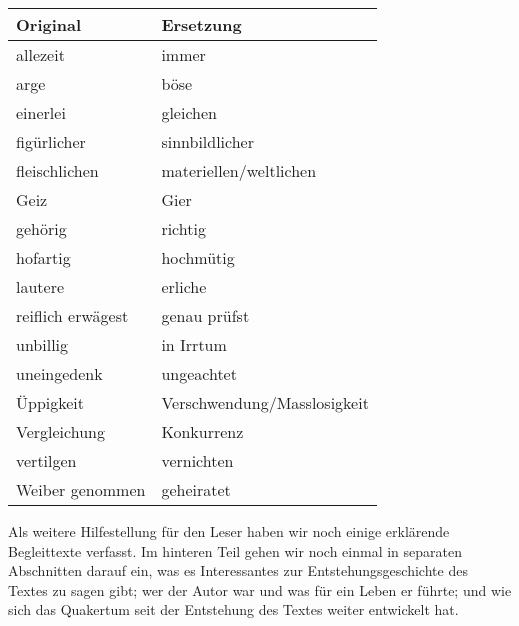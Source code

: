 \medskip

\begin{center}
\label{ref:tab_wortersetzungen}
\begin{tabular}{|l|l|} \hline
\textbf{Original}       & \textbf{Ersetzung}            \\ \hline \hline
allezeit                & immer                         \\ \hline
arge                    & böse                          \\ \hline
einerlei                & gleichen                      \\ \hline
figürlicher             & sinnbildlicher                \\ \hline
fleischlichen           & materiellen/weltlichen        \\ \hline
Geiz                    & Gier                          \\ \hline
gehörig                 & richtig                       \\ \hline
hofartig                & hochmütig                     \\ \hline
lautere                 & erliche                       \\ \hline
reiflich erwägest       & genau prüfst                  \\ \hline
unbillig                & in Irrtum                     \\ \hline
uneingedenk             & ungeachtet                    \\ \hline
Üppigkeit               & Verschwendung/Masslosigkeit   \\ \hline
Vergleichung            & Konkurrenz                    \\ \hline
vertilgen               & vernichten                    \\ \hline
Weiber genommen         & geheiratet                    \\ \hline
\end{tabular}
\end{center}
\medskip

\medskip

Als weitere Hilfestellung für den Leser haben wir noch einige erklärende
Begleittexte verfasst. Im hinteren Teil gehen wir noch einmal in separaten
Abschnitten darauf ein, was es Interessantes zur Entstehungsgeschichte des
Textes zu sagen gibt; wer der Autor war und was für ein Leben er führte; und wie
sich das Quakertum seit der Entstehung des Textes weiter entwickelt hat.

